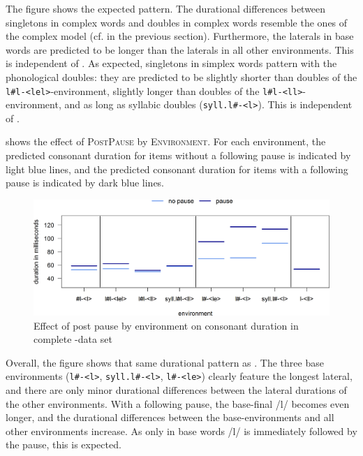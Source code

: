  The figure shows the expected pattern. The durational differences between singletons in complex words and doubles in complex words resemble the ones of the complex model (cf.  in the previous section).
 Furthermore, the laterals in base words are predicted to be longer than the laterals in all other environments. This is independent of . 
 As expected, singletons in simplex words pattern with the phonological doubles: they are predicted to be slightly shorter than doubles of the \texttt{l\#l-<lel>}-environment, slightly longer than doubles of the \texttt{l\#l-<ll>}-environment, and as long as syllabic doubles (\texttt{syll.l\#-<l>}). This is independent of .
 
 
 
  shows the effect of \textsc{PostPause} by \textsc{Environment}. For each environment, the predicted consonant duration for items without a following pause is indicated by light blue lines, and the predicted consonant duration for  items with a following pause is indicated by dark blue lines.

 \begin{figure}
 	\includegraphics [scale=0.48] {images/Experiment/LyModelCompleteInterEnvPauseLines}
 	\caption{Effect of  post pause by environment on consonant duration in complete -data set}
 	\label{fig:Env pause lyComplete experiment}
 \end{figure}
 

 Overall, the figure shows that same durational pattern as . The three base environments (\texttt{l\#-<l>}, \texttt{syll.l\#-<l>}, \texttt{l\#-<le>}) clearly feature the longest lateral, and there are only minor durational differences between the lateral durations of the other environments. 
 With a following pause, the base-final /l/ becomes even longer, and the durational differences between the base-environ\-ments and all other environments increase. As only in base words /l/ is immediately followed by the pause, this is expected. 



